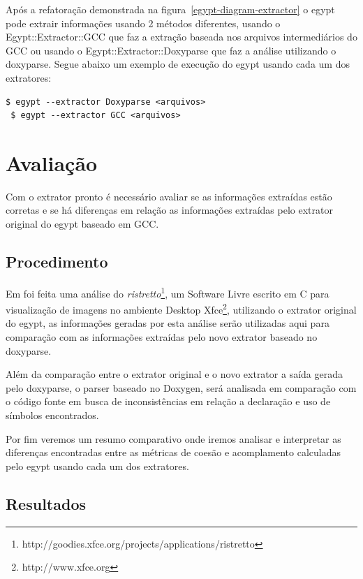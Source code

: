 Após a refatoração demonstrada na figura~\ref{egypt-diagram-extractor} o egypt
pode extrair informações usando 2 métodos diferentes, usando o
Egypt::Extractor::GCC que faz a extração baseada nos arquivos intermediários do
GCC ou usando o Egypt::Extractor::Doxyparse que faz a análise utilizando o
doxyparse. Segue abaixo um exemplo de execução do egypt usando cada um dos
extratores:

\begin{Verbatim}[frame=single,fontsize=\relsize{-2},fontfamily=courier]
 $ egypt --extractor Doxyparse <arquivos>
 $ egypt --extractor GCC <arquivos>
\end{Verbatim}


\chapter{Avaliação} \label{ch:avaliacao}

Com o extrator pronto é necessário avaliar se as informações extraídas estão
corretas e se há diferenças em relação as informações extraídas pelo extrator
original do egypt baseado em GCC.

\section{Procedimento}

Em \cite{structuralComplexityEvolution} foi feita uma análise do
{\it ristretto}\footnote{http://goodies.xfce.org/projects/applications/ristretto}, um
Software Livre escrito em C para visualização de imagens no ambiente Desktop
Xfce\footnote{http://www.xfce.org}, utilizando o extrator original do egypt, as
informações geradas por esta análise serão utilizadas aqui para comparação com
as informações extraídas pelo novo extrator baseado no doxyparse.

Além da comparação entre o extrator original e o novo extrator a saída
gerada pelo doxyparse, o parser baseado no Doxygen, será analisada em
comparação com o código fonte em busca de inconsistências em relação a
declaração e uso de símbolos encontrados.

Por fim veremos um resumo comparativo onde iremos analisar e interpretar as
diferenças encontradas entre as métricas de coesão e acomplamento calculadas
pelo egypt usando cada um dos extratores.

\section{Resultados}

